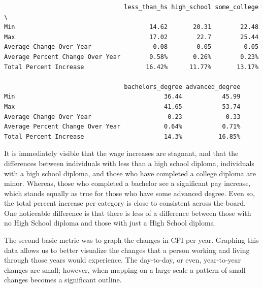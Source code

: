 \documentclass[
  letterpaper,
  DIV=11,
  numbers=noendperiod]{scrartcl}
\begin{document}
\begin{verbatim}
                                 less_than_hs high_school some_college  \
Min                                     14.62       20.31        22.48   
Max                                     17.02        22.7        25.44   
Average Change Over Year                 0.08        0.05         0.05   
Average Percent Change Over Year        0.58%       0.26%        0.23%   
Total Percent Increase                 16.42%      11.77%       13.17%   

                                 bachelors_degree advanced_degree  
Min                                         36.44           45.99  
Max                                         41.65           53.74  
Average Change Over Year                     0.23            0.33  
Average Percent Change Over Year            0.64%           0.71%  
Total Percent Increase                      14.3%          16.85%  
\end{verbatim}

It is immediately visible that the wage increases are stagnant, and that
the differences between individuals with less than a high school
diploma, individuals with a high school diploma, and those who have
completed a college diploma are minor. Whereas, those who completed a
bachelor see a significant pay increase, which stands equally as true
for those who have some advanced degree. Even so, the total percent
increase per category is close to consistent across the board. One
noticeable difference is that there is less of a difference between
those with no High School diploma and those with just a High School
diploma.

The second basic metric was to graph the changes in CPI per year.
Graphing this data allows us to better visualize the changes that a
person working and living through those years would experience. The
day-to-day, or even, year-to-year changes are small; however, when
mapping on a large scale a pattern of small changes becomes a
significant outline.
\end{document}
